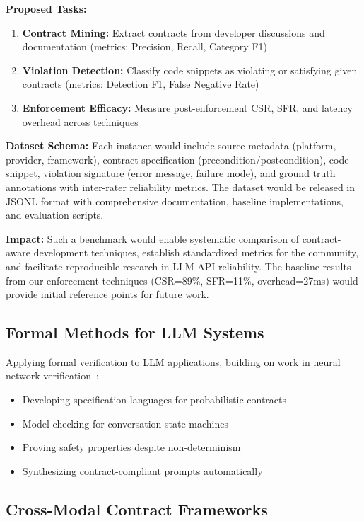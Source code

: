 \documentclass[11pt]{article}
\begin{document}
\textbf{Proposed Tasks:}
\begin{enumerate}
    \item \textbf{Contract Mining:} Extract contracts from developer discussions and documentation (metrics: Precision, Recall, Category F1)
    \item \textbf{Violation Detection:} Classify code snippets as violating or satisfying given contracts (metrics: Detection F1, False Negative Rate)
    \item \textbf{Enforcement Efficacy:} Measure post-enforcement CSR, SFR, and latency overhead across techniques
\end{enumerate}

\textbf{Dataset Schema:} Each instance would include source metadata (platform, provider, framework), contract specification (precondition/postcondition), code snippet, violation signature (error message, failure mode), and ground truth annotations with inter-rater reliability metrics. The dataset would be released in JSONL format with comprehensive documentation, baseline implementations, and evaluation scripts.

\textbf{Impact:} Such a benchmark would enable systematic comparison of contract-aware development techniques, establish standardized metrics for the community, and facilitate reproducible research in LLM API reliability. The baseline results from our enforcement techniques (CSR=89\%, SFR=11\%, overhead=27ms) would provide initial reference points for future work.

\subsection{Formal Methods for LLM Systems}

Applying formal verification to LLM applications, building on work in neural network verification~\cite{katz2017reluplex, tran2020nnv}:
\begin{itemize}
    \item Developing specification languages for probabilistic contracts
    \item Model checking for conversation state machines
    \item Proving safety properties despite non-determinism
    \item Synthesizing contract-compliant prompts automatically
\end{itemize}

\subsection{Cross-Modal Contract Frameworks}
\end{document}
